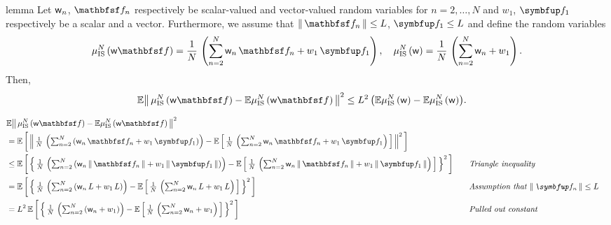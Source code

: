 \begin{theoremEnd}{lemma}\label{thm:is_variance_ratio}
  Let \(\mathsf{w}_n\), \(\rvvf_n\) respectively be scalar-valued and vector-valued random variables for \(n = 2, \ldots, N\) and \(w_1\), \(\vf_1\) respectively be a scalar and a vector.
  Furthermore, we assume that \(\norm{\rvvf_n}\leq L\), \(\vf_1 \leq L\) and define the random variables
  \begin{align*}
    \mu_{\mathrm{IS}}^N\left(\rvw\rvvf\right) = \frac{1}{N}\,\left(\sum^{N}_{n=2} \rvw_n\,\rvvf_n  + w_1\,\vf_1\right),\quad 
    \mu_{\mathrm{IS}}^N\left(\rvw\right)  = \frac{1}{N}\,\left(\sum^{N}_{n=2} \rvw_n  + w_1\right).
  \end{align*}
  Then,
  \begin{align*}
    &\mathbb{E}{
      \norm{
        \mu_{\mathrm{IS}}^N\left(\rvw\rvvf\right)
        -
        \mathbb{E}\mu_{\mathrm{IS}}^N\left(\rvw\rvvf\right)
      }^2
    }
    \leq
    L^2\,
    \big(
    \mathbb{E}{
      \mu_{\mathrm{IS}}^N\left(\rvw\right)
      -
      \mathbb{E}\mu_{\mathrm{IS}}^N\left(\rvw\right)
    }
    \big).
  \end{align*}
\end{theoremEnd}
\begin{proofEnd}
  \begin{alignat}{2}
    &\mathbb{E}{
      \norm{
        \mu_{\mathrm{IS}}^N\left(\rvw\rvvf\right)
        -
        \mathbb{E}\mu_{\mathrm{IS}}^N\left(\rvw\rvvf\right)
      }^2
    }
    \nonumber
    \\
    &=
    \E{
      \norm{\textstyle
      \frac{1}{N}\,\left(\sum^{N}_{n=2} \left(\rvw_n\,\rvvf_n  + w_1\,\vf_1\right)\right)
      -
      \E{\frac{1}{N}\,\left( \sum^{N}_{n=2} \rvw_n\,\rvvf_n  + w_1\,\vf_1\right)}
      }^2
    }
    \nonumber
    \\
    &\leq
    \E{\textstyle
    {\left\{\,
    \frac{1}{N}\,\left(\sum^{N}_{n=2} \left(\rvw_n\,\norm{\rvvf_n}  + w_1\,\norm{\vf_1}\right)\right)
    -
    \E{\frac{1}{N}\,\left( \sum^{N}_{n=2} \rvw_n\,\norm{\rvvf_n}  + w_1\,\norm{\vf_1}\right)}
    \,\right\}}^2
    }
    &&\quad\text{\textit{Triangle inequality}}
    \nonumber
    \\
    &=
    \E{\textstyle
    {\left\{\,
    \frac{1}{N}\,\left(\sum^{N}_{n=2} \left(\rvw_n\,L  + w_1\,L\right)\right)
    -
    \E{\frac{1}{N}\,\left( \sum^{N}_{n=2} \rvw_n\,L  + w_1\,L\right)}
    \,\right\}}^2
    }
    &&\quad\text{\textit{Assumption that \(\norm{\vf_n} \leq L\)}}
    \nonumber
    \\
    &=
    L^2\,\E{\textstyle
    {\left\{\,
    \frac{1}{N}\,\left(\sum^{N}_{n=2} \left(\rvw_n  + w_1\right)\right)
    -
    \E{\frac{1}{N}\,\left( \sum^{N}_{n=2} \rvw_n  + w_1\right)}
    \,\right\}}^2
    }
    &&\quad\text{\textit{Pulled out constant}}
    \nonumber
  \end{alignat}
\end{proofEnd}

